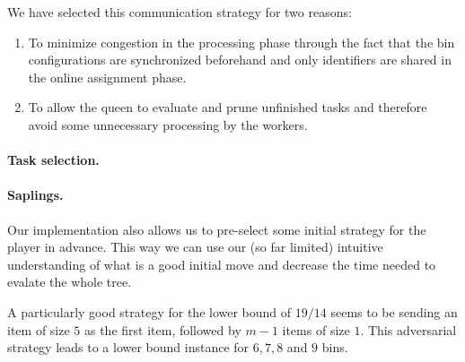 We have selected this communication strategy for two reasons:

\begin{enumerate}
\item To minimize congestion in the processing phase through the fact
that the bin configurations are synchronized beforehand and only
identifiers are shared in the online assignment phase.
\item To allow the queen to evaluate and prune unfinished tasks and
therefore avoid some unnecessary processing by the workers.
\end{enumerate}

\paragraph{Task selection.}

\paragraph{Saplings.} Our implementation also allows us to pre-select
some initial strategy for the player \adversary in advance. This way
we can use our (so far limited) intuitive understanding of what is a
good initial move and decrease the time needed to evalate the whole
tree.

A particularly good strategy for the lower bound of $19/14$ seems to
be sending an item of size $5$ as the first item, followed by $m-1$
items of size $1$. This adversarial strategy leads to a lower bound
instance for $6,7,8$ and $9$ bins.



